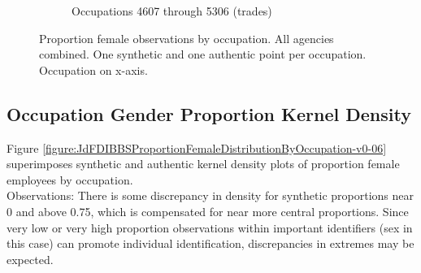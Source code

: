 \documentclass[10pt, letterpaper]{article}
\begin{document}
\begin{spacing}{1.0}
\begin{figure}[h]
\begin{subfigure}{1\textwidth}
        \caption{Occupations 4607 through 5306 (trades)}
        \vspace{10pt}
    \end{subfigure}
    \caption{Proportion female observations by occupation.  All agencies combined.  One synthetic and one authentic point per occupation.  Occupation on x-axis.}
    \label{figure:JdFDIBBSOccupationProportionBar4}
\end{figure}

\clearpage

\subsection{Occupation Gender Proportion Kernel Density}

Figure \ref{figure:JdFDIBBSProportionFemaleDistributionByOccupation-v0-06} superimposes synthetic and authentic kernel density plots of proportion female employees by occupation.\\

Observations:  There is some discrepancy in density for synthetic proportions near 0 and above 0.75, which is compensated for near more central proportions.  Since very low or very high proportion observations within important identifiers (sex in this case) can promote individual identification, discrepancies in extremes may be expected.\\

\vspace{20pt}


\end{spacing}
\end{document}
